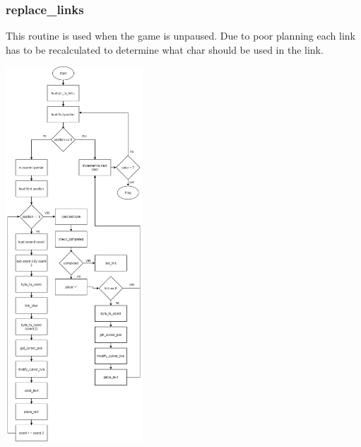 \documentclass{article}
\begin{document}
    \subsubsection{replace\_links}
        This routine is used when the game is unpaused.  Due to poor planning
        each link has to be recalculated to determine what char should be used
        in the link.
        \begin{center}
            {\includegraphics[height=14cm]{replace_links.png}\centering} 
        \end{center}
        \newpage
        
\end{document}
